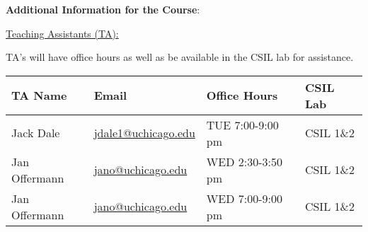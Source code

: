 \noindent \textbf {\Large \sc Additional Information for the Course}:

\vspace{1cm}

\noindent \underline{Teaching Assistants (TA):}

\noindent TA's will have office hours as well as be available in the CSIL lab for assistance.

\vspace{1cm}

\begin{tabular}{l l | l | l }

TA Name & Email & Office Hours & CSIL Lab \\ \hline

Jack Dale          & \href{mailto:jdale1@uchicago.edu}{jdale1@uchicago.edu}  & TUE  7:00-9:00 pm  & CSIL 1\&2 \\
Jan Offermann      & \href{mailto:jano@uchicago.edu}{jano@uchicago.edu}      & WED  2:30-3:50 pm  & CSIL 1\&2 \\
Jan Offermann      & \href{mailto:jano@uchicago.edu}{jano@uchicago.edu}      & WED  7:00-9:00 pm  & CSIL 1\&2 \\


\end{tabular}

\vspace{1cm}


